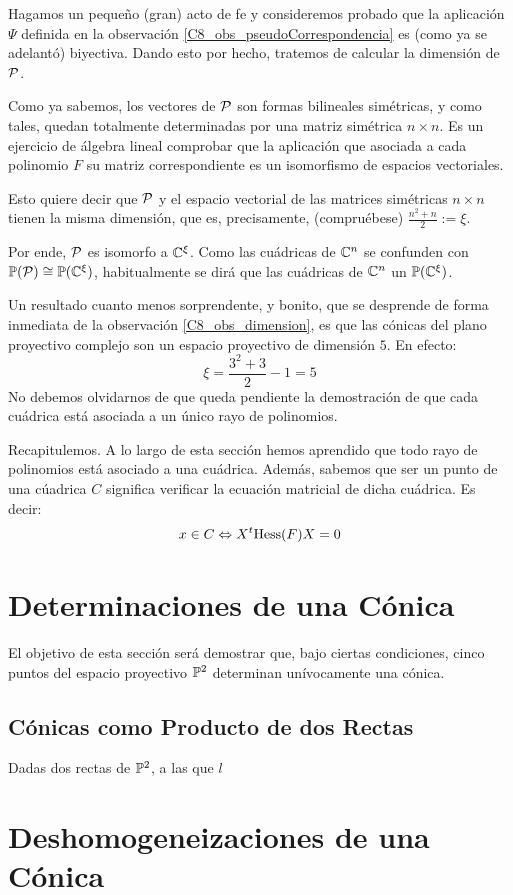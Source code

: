 	Hagamos un pequeño (gran) acto de fe y consideremos probado que la aplicación $\Psi$ definida en la observación \ref{C8_obs_pseudoCorrespondencia} es (como ya se adelantó) biyectiva. Dando esto por hecho, tratemos de calcular la dimensión de $\mc{P}$.
	\begin{obs}[Dimensión de $\mc{P}$]
		\label{C8_obs_dimension}
		Como ya sabemos, los vectores de $\mc{P}$ son formas bilineales simétricas, y como tales, quedan totalmente determinadas por una matriz simétrica $n\times n$. Es un ejercicio de álgebra lineal comprobar que la aplicación que asociada a cada polinomio $F$ su matriz correspondiente es un isomorfismo de espacios vectoriales.
		
		Esto quiere decir que $\mc{P}$ y el espacio vectorial de las matrices simétricas $n\times n$ tienen la misma dimensión, que es, precisamente, (compruébese) $\frac{n^2+n}{2}:=\xi$.
		
		Por ende, $\mc{P}$ es isomorfo a $\mathbb{C}^\xi$. Como las cuádricas de $\mathbb{C}^n$ se confunden con $\mathbb{P}(\mathcal{P})\cong\mathbb{P}(\mathbb{C}^\xi)$, habitualmente se dirá que las cuádricas de $\mathbb{C}^n$  un $\mathbb{P}(\mathbb{C}^\xi)$.
	\end{obs}
	\begin{obs}
		Un resultado cuanto menos sorprendente, y bonito, que se desprende de forma inmediata de la observación \ref{C8_obs_dimension}, es que las cónicas del plano proyectivo complejo son un espacio proyectivo de dimensión $5$. En efecto:
		\[\xi=\frac{3^2+3}{2}-1=5\]
		No debemos olvidarnos de que queda pendiente la demostración de que cada cuádrica está asociada a un único rayo de polinomios.
	\end{obs}
Recapitulemos. A lo largo de esta sección hemos aprendido que todo rayo de polinomios está asociado a una cuádrica. Además, sabemos que ser un punto de una cúadrica $C$ significa verificar la ecuación matricial de dicha cuádrica. Es decir:
\[x\in C\Leftrightarrow X^t\mathrm{Hess}(F)X=0\] 
\section{Determinaciones de una Cónica}
El objetivo de esta sección será demostrar que, bajo ciertas condiciones, cinco puntos del espacio proyectivo $\mathbb{P}^2$ determinan unívocamente una cónica.
\subsection{Cónicas como Producto de dos Rectas}
Dadas dos rectas de $\mathbb{P}^2$, a las que $l$
\section{Deshomogeneizaciones de una Cónica}